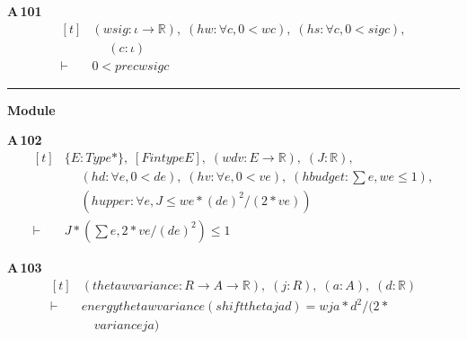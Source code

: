 \noindent\textbf{A\,101}\quad{}
{\footnotesize\[ \begin{aligned}[t]
&(\mathit{w} \mathit{sig} : \iota \to \mathbb{R} ),\; (\mathit{hw} : \forall \mathit{c}, 0 < \mathit{w} \mathit{c}),\; (\mathit{hs} : \forall \mathit{c}, 0 < \mathit{sig} \mathit{c}),\\
&\quad \; (\mathit{c} : \iota )\\
\vdash\;&0 < \mathit{prec} \mathit{w} \mathit{sig} \mathit{c}
\end{aligned} \]}

\vspace{4pt}\noindent\rule{\columnwidth}{0.4pt}\par\vspace{2pt}
\noindent\textbf{Module }\par\vspace{3pt}

\noindent\textbf{A\,102}\quad{}
{\footnotesize\[ \begin{aligned}[t]
&\{ \mathit{E} : \mathit{Type}*\},\; [\mathit{Fintype} \mathit{E}],\; (\mathit{w} \mathit{d} \mathit{v} : \mathit{E} \to \mathbb{R} ),\; (\mathit{J} : \mathbb{R} ),\\
&\quad \; (\mathit{hd} : \forall \mathit{e},0 < \mathit{d} \mathit{e}),\; (\mathit{hv} : \forall \mathit{e},0 < \mathit{v} \mathit{e}),\; (\mathit{hbudget} : \textstyle\sum \mathit{e},\mathit{w} \mathit{e} \leq 1),\\
&\quad \; (\mathit{hupper} : \forall \mathit{e},\mathit{J} \leq \mathit{w} \mathit{e}*(\mathit{d} \mathit{e})^{2}/(2*\mathit{v} \mathit{e}))\\
\vdash\;&\mathit{J}*(\textstyle\sum \mathit{e},2*\mathit{v} \mathit{e}/(\mathit{d} \mathit{e})^{2}) \leq 1
\end{aligned} \]}

\noindent\textbf{A\,103}\quad{}
{\footnotesize\[ \begin{aligned}[t]
&(\mathit{theta} \mathit{w} \mathit{variance} : \mathit{R} \to \mathit{A} \to \mathbb{R} ),\; (\mathit{j} : \mathit{R}),\; (\mathit{a} : \mathit{A}),\; (\mathit{d} : \mathbb{R} )\\
\vdash\;&\mathit{energy} \mathit{theta} \mathit{w} \mathit{variance} (\mathit{shift} \mathit{theta} \mathit{j} \mathit{a} \mathit{d}) = \mathit{w} \mathit{j} \mathit{a}*\mathit{d}^{2}/(2*\\
&\quad \mathit{variance} \mathit{j} \mathit{a})
\end{aligned} \]}

